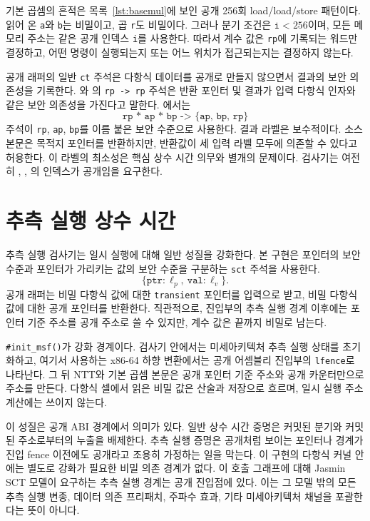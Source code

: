 \documentclass[10pt,twocolumn]{article}
\newcommand{\jasmin}{Jasmin}
\newcommand{\ct}{상수 시간}
\newcommand{\sct}{추측 실행 상수 시간}
\begin{document}
기본 곱셈의 흔적은 목록~\ref{lst:basemul}에 보인 공개 256회
load/load/store 패턴이다. 읽어 온 \texttt{a}와 \texttt{b}는 비밀이고,
곱 \texttt{r}도 비밀이다. 그러나 분기 조건은 \(\texttt{i}<256\)이며,
모든 메모리 주소는 같은 공개 인덱스 \texttt{i}를 사용한다. 따라서
계수 값은 \texttt{rp}에 기록되는 워드만 결정하고, 어떤 명령이 실행되는지
또는 어느 위치가 접근되는지는 결정하지 않는다.

공개 래퍼의 일반 \texttt{ct} 주석은 다항식 데이터를 공개로 만들지
않으면서 결과의 보안 의존성을 기록한다. 와
의 \texttt{rp -> rp} 주석은 반환 포인터 및 결과가
입력 다항식 인자와 같은 보안 의존성을 가진다고 말한다.
에서는
\[
  \texttt{rp * ap * bp -> \{ap, bp, rp\}}
\]
주석이 \texttt{rp}, \texttt{ap}, \texttt{bp}를 이름 붙은 보안 수준으로
사용한다. 결과 라벨은 보수적이다. 소스 본문은 목적지 포인터를 반환하지만,
반환값이 세 입력 라벨 모두에 의존할 수 있다고 허용한다. 이 라벨의
최소성은 핵심 \ct{} 의무와 별개의 문제이다. 검사기는 여전히
, , 의 인덱스가 공개임을 요구한다.

\section{\sct{}}

추측 실행 검사기는 일시 실행에 대해 일반 성질을 강화한다. 본
구현은 포인터의 보안 수준과 포인터가 가리키는 값의 보안 수준을 구분하는
\texttt{sct} 주석을 사용한다.
\[
  \{\texttt{ptr}:\ell_p,\ \texttt{val}:\ell_v\}.
\]
공개 래퍼는 비밀 다항식 값에 대한 \texttt{transient} 포인터를 입력으로 받고,
비밀 다항식 값에 대한 공개 포인터를 반환한다. 직관적으로, 진입부의
추측 실행 경계 이후에는 포인터 기준 주소를 공개 주소로 쓸 수 있지만,
계수 값은 끝까지 비밀로 남는다.

\texttt{\#init\_msf()}가 강화 경계이다. 검사기 안에서는
미세아키텍처 추측 실행 상태를 초기화하고, 여기서 사용하는 x86-64
하향 변환에서는 공개 어셈블리 진입부의 \texttt{lfence}로 나타난다.
그 뒤 NTT와 기본 곱셈 본문은 공개 포인터 기준 주소와 공개 카운터만으로
주소를 만든다. 다항식 셀에서 읽은 비밀 값은 산술과 저장으로 흐르며,
일시 실행 주소 계산에는 쓰이지 않는다.

이 성질은 공개 ABI 경계에서 의미가 있다. 일반 \ct{} 증명은 커밋된
분기와 커밋된 주소로부터의 누출을 배제한다. 추측 실행 증명은
공개처럼 보이는 포인터나 경계가 진입 fence 이전에도 공개라고 조용히
가정하는 일을 막는다. 이 구현의 다항식 커널 안에는 별도로 강화가
필요한 비밀 의존 경계가 없다. 이 호출 그래프에 대해 \jasmin{} SCT
모델이 요구하는 추측 실행 경계는 공개 진입점에 있다. 이는 그 모델
밖의 모든 추측 실행 변종, 데이터 의존 프리패치, 주파수 효과, 기타
미세아키텍처 채널을 포괄한다는 뜻이 아니다.
\end{document}
